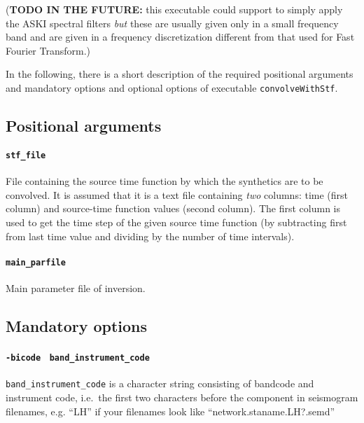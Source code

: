 \documentclass[12pt,a4paper]{article}
\newcommand{\lcode}[1]{\nolinkurl{#1}}
\newcommand{\ASKI}{ {\ttfamily ASKI} }
\begin{document}
({\bf TODO IN THE FUTURE:} this executable could support to simply apply the \ASKI{} spectral filters \emph{but} 
these are usually given only in a small frequency band and are given in a frequency discretization different from
that used for Fast Fourier Transform.)

In the following, there is a short description of the required positional arguments and mandatory
options and optional options of executable \lcode{convolveWithStf}.

\subsection*{Positional arguments}
\paragraph{\lcode{stf_file}}
File containing the source time function by which the synthetics are to be convolved. It is assumed that it is a
text file containing \emph{two} columns: time (first column) and source-time function values (second column).
The first column is used to get the time step of the given source time function (by subtracting first from last 
time value and dividing by the number of time intervals).
\paragraph{\lcode{main_parfile}}
Main parameter file of inversion.

\subsection*{Mandatory options}
\paragraph{\lcode{-bicode} \lcode{ band_instrument_code}}
\lcode{band_instrument_code} is a character string consisting of bandcode and instrument code, i.e.\ 
the first two characters before the component in seismogram filenames, e.g. ``LH'' if your filenames 
look like ``network.staname.LH?.semd''
\end{document}
